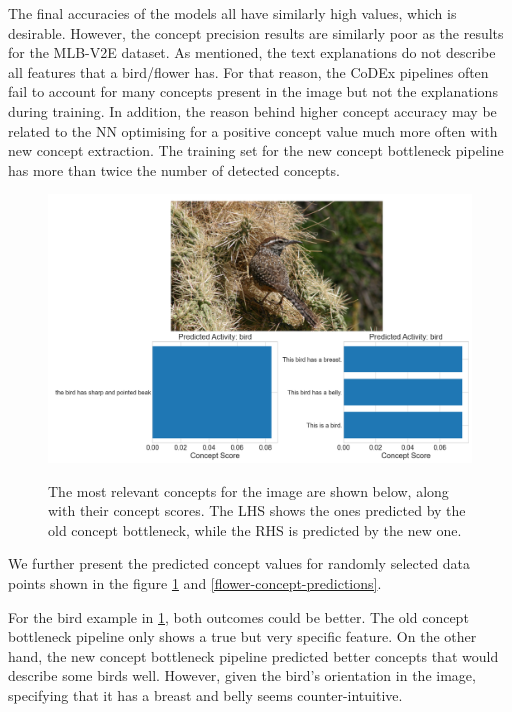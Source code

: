 The final accuracies of the models all have similarly high values, which is desirable.
However, the concept precision results are similarly poor as the results for the MLB-V2E \cite{RefWorks:RefID:16-2021automatic} dataset.
As mentioned, the text explanations do not describe all features that a bird/flower has.
For that reason, the CoDEx pipelines often fail to account for many concepts present in the image but not the explanations during training.
In addition, the reason behind higher concept accuracy may be related to the NN optimising for a positive concept value much more often with new concept extraction.
The training set for the new concept bottleneck pipeline has more than twice the number of detected concepts.

\begin{figure}[h]
\caption{The most relevant concepts for the image are shown below, along with their concept scores. The LHS shows the ones predicted by the old concept bottleneck, while the RHS is predicted by the new one.}
\centering
\includegraphics[width=\textwidth]{concept-bottleneck-pipeline/birds_predictions.png}
\label{bird-concept-predictions}
\end{figure}

We further present the predicted concept values for randomly selected data points shown in the figure \ref{bird-concept-predictions} and \ref{flower-concept-predictions}.

For the bird example in \ref{bird-concept-predictions}, both outcomes could be better.
The old concept bottleneck pipeline only shows a true but very specific feature.
On the other hand, the new concept bottleneck pipeline predicted better concepts that would describe some birds well.
However, given the bird's orientation in the image, specifying that it has a breast and belly seems counter-intuitive.

